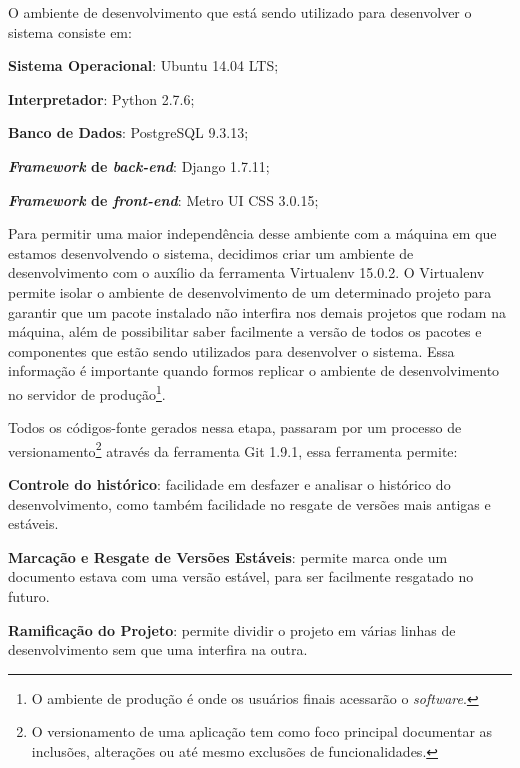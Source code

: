 O ambiente de desenvolvimento que est\'a sendo utilizado para desenvolver o sistema consiste em:
\begin{alineas}
	\item \textbf{Sistema Operacional}: Ubuntu 14.04 LTS;
	\item \textbf{Interpretador}: Python 2.7.6;
	\item \textbf{Banco de Dados}: PostgreSQL 9.3.13;
	\item \textbf{\textit{Framework} de \textit{back-end}}: Django 1.7.11;
	\item \textbf{\textit{Framework} de \textit{front-end}}: Metro UI CSS 3.0.15;
\end{alineas}

Para permitir uma maior independ\^encia desse ambiente com a máquina em que estamos desenvolvendo o sistema, decidimos criar um ambiente de desenvolvimento com o auxílio da 
ferramenta Virtualenv 15.0.2. O Virtualenv permite isolar o ambiente de desenvolvimento de um determinado projeto para garantir que um pacote instalado não interfira nos demais projetos que 
rodam na máquina, al\'em de possibilitar saber facilmente a vers\~ao de todos os pacotes e componentes que est\~ao sendo utilizados para desenvolver o sistema. Essa informa\c{c}\~ao \'e 
importante quando formos replicar o ambiente de desenvolvimento no servidor de produ\c{c}\~ao\footnote{O ambiente de produção é onde os usuários finais acessarão o \textit{software}.}. 

Todos os c\'odigos-fonte gerados nessa etapa, passaram por um processo de versionamento\footnote{O versionamento de uma aplicação tem como 
foco principal documentar as inclusões, alterações ou até mesmo exclusões de funcionalidades.} atrav\'es da ferramenta Git 1.9.1, 
essa ferramenta permite:

\begin{alineascomponto}
	\item \textbf{Controle do histórico}: facilidade em desfazer e analisar o histórico do desenvolvimento, como também facilidade no resgate de versões mais antigas e estáveis.
	\item \textbf{Marca\c{c}\~ao e Resgate de Vers\~oes Est\'aveis}: permite marca onde um documento estava com uma vers\~ao est\'avel, para ser facilmente resgatado no futuro.
	\item \textbf{Ramifica\c{c}\~ao do Projeto}: permite dividir o projeto em v\'arias linhas de desenvolvimento sem que uma interfira na outra. 
\end{alineascomponto}

